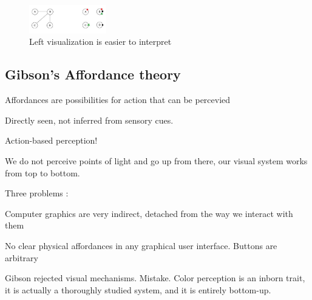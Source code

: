\begin{mdframed}
\begin{multicols}{2}
        \begin{figure}[H]
            \centering
            \includegraphics[width=0.3\textwidth]{graph_vis.png}
            \caption{Left visualization is easier to interpret}
        \end{figure}



\end{multicols}\end{mdframed}




\begin{mdframed}\begin{multicols}{2}
    \subsection{Gibson's Affordance theory}

\begin{compactdesc}
\item[Affordances] are possibilities for action that can be percevied
\item[Directly] seen, not inferred from sensory cues.
\item[Action-based] perception!
\item[We do not perceive] points of light and go up from there, our visual
    system works from top to bottom.
\item[Three problems]:
    \begin{compactenum}
    \item Computer graphics are very indirect, detached from the way we
        interact with them
    \item No clear physical affordances in any graphical user interface.
        Buttons are arbitrary
    \item Gibson rejected visual mechanisms. Mistake. Color perception is an inborn
        trait, it is actually a thoroughly studied system, and it is entirely
        bottom-up.
    \end{compactenum}
\end{compactdesc}

\end{multicols}
\end{mdframed}
